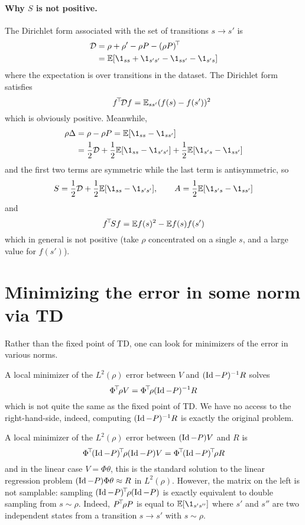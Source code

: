 \documentclass[11pt,a4paper]{article}
\newcommand{\Dir}{\mathcal{D}}
\begin{document}
\paragraph{Why $S$ is not positive.} The Dirichlet form associated
with the set of transitions $s\to s'$ is
\begin{align}
\Dir&=\rho+\rho'-\rho P-\transp{(\rho P)}
\\&=\E[\1_{ss}+\1_{s's'}-\1_{ss'}-\1_{s's}]
\end{align}
where the expectation is over transitions in the dataset. The Dirichlet
form satisfies
\begin{equation}
\qquad \transp{f}\Dir f=\E_{ss'}(f(s)-f(s'))^2
\end{equation}
which is obviously positive. Meanwhile,
\begin{align}
\rho\Delta&=\rho-\rho P=\E[\1_{ss}-\1_{ss'}]
\\&=\frac12 \Dir+\frac12 \E[\1_{ss}-\1_{s's'}]+\frac12
\E[\1_{s's}-\1_{ss'}]
\end{align}
and the first two terms are symmetric while the last term is
antisymmetric, so
\begin{equation}
S=\frac12 \Dir+\frac12 \E[\1_{ss}-\1_{s's'}],\qquad A=\frac12
\E[\1_{s's}-\1_{ss'}]
\end{equation}
and
\begin{equation}
f^{\!\top}\!Sf=\mathbb{E} f(s)^2-\mathbb{E} f(s)f(s')
\end{equation}
which in general is not positive (take $\rho$ concentrated on a single $s$, and a large value
for $f(s')$).

\section{Minimizing the error in some norm via TD}
\label{sec:norms}

Rather than the fixed point of TD, one
can look for minimizers of the error in various norms.

A local minimizer of the $L^2(\rho)$ error between $V$ and
$(\operatorname{Id}-P)^{-1}R$ solves
\begin{equation}
\Phi^{\!\top}\! \rho V=\Phi^{\!\top}\!\rho (\operatorname{Id}-P)^{-1} R
\end{equation}
which is not quite the same as the fixed point of TD. We have no access
to the right-hand-side, indeed, computing $(\operatorname{Id}-P)^{-1} R$ is exactly the
original problem.

A local minimizer of the
$L^2(\rho)$ error between $(\operatorname{Id}-P)V$ and $R$ is
\begin{equation}
\transp{\Phi}\transp{(\Id-P)}\rho(\Id-P)V=\transp{\Phi}\transp{(\Id-P)}\rho R
\end{equation}
and in the linear case $V=\Phi\theta$, this is the standard solution to
the linear regression problem $(\operatorname{Id}-P)\Phi\theta\approx R$ in
$L^2(\rho)$. However, the matrix on the left is not samplable: sampling
$(\operatorname{Id}-P)^{\!\top}\!\rho(\operatorname{Id}-P)$ is exactly equivalent to double sampling
from $s\sim \rho$.
Indeed, $P^{\!\top}\!\rho P$ is equal to $\E[\1_{s' s''}]$ where $s'$ and
$s''$ are two independent states from a transition $s\to s'$ with $s\sim
\rho$.
\end{document}
